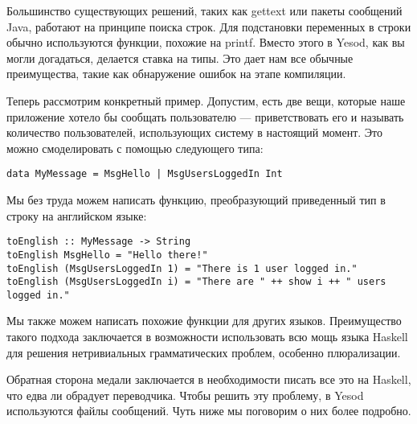 Большинство существующих решений, таких как gettext или пакеты сообщений Java, работают на принципе поиска строк. Для подстановки переменных в строки обычно используются функции, похожие на printf. Вместо этого в Yesod, как вы могли догадаться, делается ставка на типы. Это дает нам все обычные преимущества, такие как обнаружение ошибок на этапе компиляции.

Теперь рассмотрим конкретный пример. Допустим, есть две вещи, которые наше приложение хотело бы сообщать пользователю --- приветствовать его и называть количество пользователей, использующих систему в настоящий момент. Это можно смоделировать с помощью следующего типа:

\begin{lstlisting}
data MyMessage = MsgHello | MsgUsersLoggedIn Int
\end{lstlisting}

Мы без труда можем написать функцию, преобразующий приведенный тип в строку на английском языке:

\begin{lstlisting}
toEnglish :: MyMessage -> String
toEnglish MsgHello = "Hello there!"
toEnglish (MsgUsersLoggedIn 1) = "There is 1 user logged in."
toEnglish (MsgUsersLoggedIn i) = "There are " ++ show i ++ " users logged in."
\end{lstlisting}

Мы также можем написать похожие функции для других языков. Преимущество такого подхода заключается в возможности использовать всю мощь языка Haskell для решения нетривиальных грамматических проблем, особенно плюрализации. %


Обратная сторона медали заключается в необходимости писать все это на Haskell, что едва ли обрадует переводчика. Чтобы решить эту проблему, в Yesod используются файлы сообщений. Чуть ниже мы поговорим о них более подробно. %

